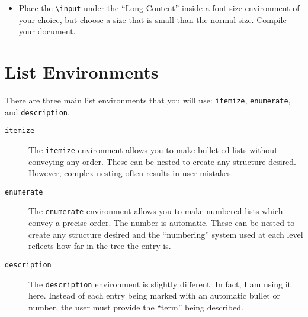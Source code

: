 \begin{itemize}
\item Place the \texttt{\textbackslash input} under the ``Long
  Content'' inside a font size environment of your choice, but choose
  a size that is small than the normal size. Compile your document.
\end{itemize}

\section{List Environments}
There are three main list environments that you will use:
\texttt{itemize}, \texttt{enumerate}, and \texttt{description}.

\begin{description}
\item[\texttt{itemize}] The \texttt{itemize} environment allows you to
  make bullet-ed lists without conveying any order. These can be
  nested to create any structure desired. However, complex nesting
  often results in user-mistakes.
\item[\texttt{enumerate}] The \texttt{enumerate} environment allows
  you to make numbered lists which convey a precise order. The number
  is automatic. These can be nested to create any structure desired
  and the ``numbering'' system used at each level reflects how far in
  the tree the entry is.
\item[\texttt{description}] The \texttt{description} environment is
  slightly different. In fact, I am using it here. Instead of each
  entry being marked with an automatic bullet or number, the user must
  provide the ``term'' being described.
\end{description}

